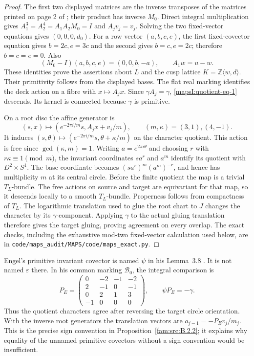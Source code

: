 \begin{proof}
The first two displayed matrices are the inverse transposes of
the matrices printed on page 2 of \cite{mapsAC26}; their product
has inverse $M_0$.  Direct integral multiplication gives
$A_1^3=A_2^4=A_1A_2M_0=I$ and $A_jv_j=v_j$.
Solving the two fixed-vector equations gives $(0,0,0,d_0)$.
For a row vector $(a,b,c,e)$, the first fixed-covector equation
gives $b=2c,e=3c$ and the second gives $b=c,e=2c$;
therefore $b=c=e=0$.  Also
\[
 (M_0-I)(a,b,c,e)=(0,0,b,-a),\qquad
 A_1w=u-w.
\]
These identities prove the assertions about $L$ and the cusp
lattice $K=\mathbb Z\langle w,d\rangle$.  Their primitivity follows
from the displayed bases.  The flat real marking identifies the
deck action on a fibre with $x\mapsto A_jx$.  Since
$\gamma A_j=\gamma$, \eqref{mapsI:quotient-eq-1} descends.  Its kernel is connected
because $\gamma$ is primitive.

On a root disc the affine generator is
\[
 (s,x)\longmapsto
 (e^{-2\pi i/m}s,A_jx+v_j/m),\qquad (m,\kappa)=(3,1),(4,-1).
\]
It induces $(s,\theta)\mapsto
(e^{-2\pi i/m}s,\theta+\kappa/m)$ on the character quotient.
This action is free since $\gcd(\kappa,m)=1$.  Writing
$a=e^{2\pi i\theta}$ and choosing $r$ with $r\kappa\equiv1\pmod m$,
the invariant coordinates $s a^r$ and $a^m$ identify its quotient
with $D^2\times S^1$.  The base coordinate becomes
$(s a^r)^m(a^m)^{-r}$, and hence has multiplicity $m$ at its
central circle.  Before the finite quotient the map is a trivial
$T_L$-bundle.  The free actions on source and target are
equivariant for that map, so it descends locally to a smooth
$T_L$-bundle.  Properness follows from compactness of $T_L$.
The logarithmic translation used to glue the root chart to $J$
changes the character by its $\gamma$-component.  Applying
$\gamma$ to the actual gluing translation therefore gives the
target gluing, proving agreement on every overlap.
The exact checks, including the exhaustive mod-two fixed-vector
calculation used below, are in \texttt{code/maps\_audit/MAPS/code/maps\_exact.py}.
\end{proof}


Engel's primitive invariant covector is named $\psi$ in his
Lemma~3.8 \cite[Lemma~3.8]{mapsEngel}.  It is not named $\varepsilon$ there.  In his
common marking $\mathcal B_0$, the integral comparison is
\[
 P_E=\begin{pmatrix}0&-2&-1&-2\\2&-1&0&-1\\0&2&1&3\\-1&0&0&0\end{pmatrix},
 \qquad \psi P_E=-\gamma.
 \label{mapsI:quotient-eq-2}
\]
Thus the quotient characters agree after reversing the target
circle orientation.  With the inverse root generators the
translation vectors are $a_{j-1}=-P_Ev_j/m_j$.
This is the precise sign convention in Proposition~\ref{fam:src:B.2.2}; it explains why equality of the unnamed primitive
covectors without a sign convention would be insufficient.

